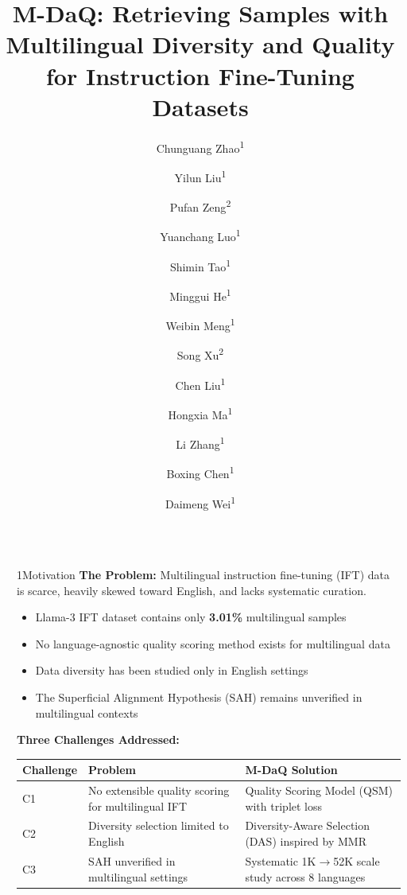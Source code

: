 \documentclass[final]{beamer}
\title{\huge M-DaQ: Retrieving Samples with Multilingual Diversity and Quality for Instruction Fine-Tuning Datasets}
\author{
  Chunguang Zhao\textsuperscript{1} \and
  Yilun Liu\textsuperscript{1} \and
  Pufan Zeng\textsuperscript{2} \and
  Yuanchang Luo\textsuperscript{1} \and
  Shimin Tao\textsuperscript{1} \and
  Minggui He\textsuperscript{1} \and
  Weibin Meng\textsuperscript{1} \and
  Song Xu\textsuperscript{2} \and
  Chen Liu\textsuperscript{1} \and
  Hongxia Ma\textsuperscript{1} \and
  Li Zhang\textsuperscript{1} \and
  Boxing Chen\textsuperscript{1} \and
  Daimeng Wei\textsuperscript{1}
}
\institute[shortinst]{
  \textsuperscript{1} Huawei Technologies Ltd. \samelineand
  \textsuperscript{2} University of Science and Technology of China
}
\newlength{\sepwidth}
\newlength{\colwidth}
\newcommand{\separatorcolumn}{\begin{column}{\sepwidth}\end{column}}
\begin{document}
\begin{frame}[t]
\begin{columns}[t]
\separatorcolumn

\begin{column}{\colwidth}

  \begin{block}{\Large 1\quad Motivation}
    \textbf{The Problem:} Multilingual instruction fine-tuning (IFT) data is scarce, heavily skewed toward English, and lacks systematic curation.

    \vspace{0.5em}
    \begin{itemize}
      \item Llama-3 IFT dataset contains only \textbf{3.01\%} multilingual samples
      \item No language-agnostic quality scoring method exists for multilingual data
      \item Data diversity has been studied only in English settings
      \item The Superficial Alignment Hypothesis (SAH) remains unverified in multilingual contexts
    \end{itemize}

    \vspace{0.8em}
    \textbf{Three Challenges Addressed:}

    \vspace{0.3em}
    \begin{center}
    \begin{tabular}{p{} p{} p{}}
      \toprule
      \textbf{Challenge} & \textbf{Problem} & \textbf{M-DaQ Solution} \\
      \midrule
      C1 & No extensible quality scoring for multilingual IFT & Quality Scoring Model (QSM) with triplet loss \\
      C2 & Diversity selection limited to English & Diversity-Aware Selection (DAS) inspired by MMR \\
      C3 & SAH unverified in multilingual settings & Systematic 1K$\to$52K scale study across 8 languages \\
      \bottomrule
    \end{tabular}
    \end{center}
  \end{block}


\end{column}
\end{columns}
\end{frame}
\end{document}
